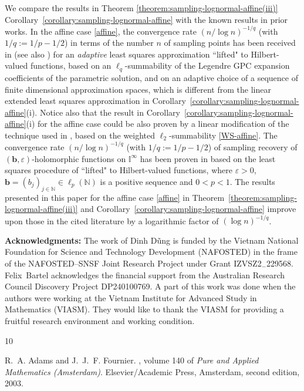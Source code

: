 \documentclass[11pt]{article}
\numberwithin{equation}{section}
\theoremstyle{definition}
\theoremstyle{remark}
\newcommand{\brac}[1]{\left(#1\right)}
\newcommand{\bb}{{\boldsymbol{b}}}
\def\NN{{\mathbb N}}
\def\NN{{\mathbb N}}
\def\IIi{{\mathbb I}^\infty}
\def\NN{{\mathbb N}}
\begin{document}
{We compare the results in Theorem \ref{theorem:sampling-lognormal-affine(iii)}  Corollary~\ref{corollary:sampling-lognormal-affine} with the known results in prior works.
In the affine case \eqref{affine}, the convergence rate $(n/\log n)^{-1/q}$ (with $1/q:= 1/p - 1/2$) in terms of the number $n$ of sampling points has been received in \cite{CCMNT2015} (see also \cite{CM2018}) for an  \emph{adaptive} least squares approximation ``lifted"  to Hilbert-valued functions, based on an $\ell_q$-summability of the Legendre GPC expansion coefficients of the parametric solution, and on an adaptive choice of a sequence of finite dimensional approximation spaces, which is different from the linear extended least squares approximation in Corollary~\ref{corollary:sampling-lognormal-affine}(i). Notice also that the result in Corollary~\ref{corollary:sampling-lognormal-affine}(i) for the affine case could be also proven by a linear modification of the technique used in \cite{CCMNT2015}, based on the weighted $\ell_2$-summability \eqref{WS-affine}. 
The convergence rate $(n/\log n)^{-1/q}$ (with $1/q:= 1/p - 1/2$) of sampling recovery of $(\bb,\varepsilon)$-holomorphic functions on $\IIi$ has been proven in \cite{ADM2024} based on the least squares procedure of \cite{KU21} ``lifted" to Hilbert-valued functions, where $\varepsilon >0$, $\bb=\brac{b_j}_{j \in \NN} \in \ell_p(\NN)$ is a positive sequence and $0<p<1$. The results presented in this paper for the affine case \eqref{affine} in Theorem~\ref{theorem:sampling-lognormal-affine(iii)} and Corollary~\ref{corollary:sampling-lognormal-affine} improve upon those in the cited literature by a logarithmic factor of $(\log n)^{-1/q}$.


 \medskip
 \noindent
 {\bf Acknowledgments:} 
The work of Dinh D\~ung is funded by the Vietnam National Foundation for Science and Technology Development (NAFOSTED) in the frame of the NAFOSTED--SNSF Joint Research Project under Grant 
IZVSZ2$_{ - }$229568. 
Felix~Bartel acknowledges the financial support from the Australian Research Council Discovery Project DP240100769.
 A part of this work was done when the authors were working at the Vietnam Institute for Advanced Study in Mathematics (VIASM). They would like to thank the VIASM for providing a fruitful research environment and working condition.
 


\begin{thebibliography}{10}

R.~A. Adams and J.~J.~F. Fournier.
, volume 140 of {\em Pure and Applied
  Mathematics (Amsterdam)}.
\newblock Elsevier/Academic Press, Amsterdam, second edition, 2003.


\end{thebibliography}}
\end{document}
